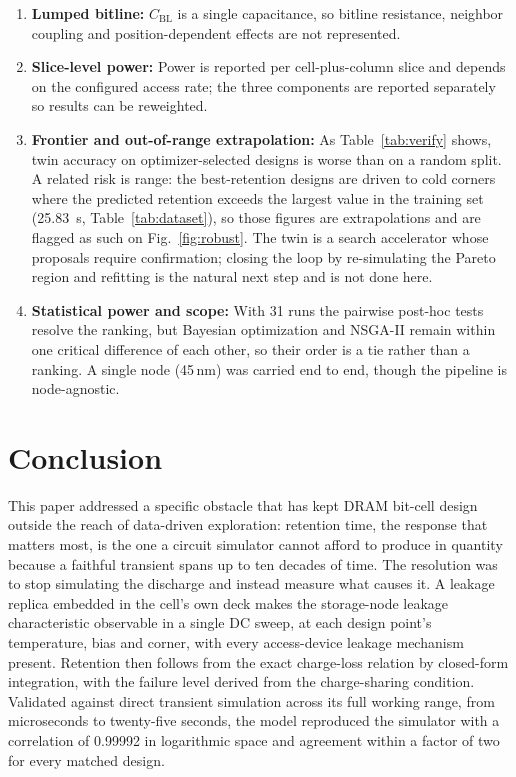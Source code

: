 \documentclass[11pt,a4paper]{article}
\newcommand{\Cbl}{C_{\mathrm{BL}}}
\begin{document}
\begin{enumerate}
\item \textbf{Lumped bitline:} $\Cbl$ is a single capacitance, so bitline
resistance, neighbor coupling and position-dependent effects are not
represented.
\item \textbf{Slice-level power:} Power is reported per cell-plus-column slice and
depends on the configured access rate; the three components are reported
separately so results can be reweighted.
\item \textbf{Frontier and out-of-range extrapolation:} As Table~\ref{tab:verify}
shows, twin accuracy on optimizer-selected designs is worse than on a random split.
A related risk is range: the best-retention designs are driven to cold corners where
the predicted retention exceeds the largest value in the training set
(\SI{25.83}{\second}, Table~\ref{tab:dataset}), so those figures are extrapolations
and are flagged as such on Fig.~\ref{fig:robust}. The twin is a search accelerator
whose proposals require confirmation; closing the loop by re-simulating the Pareto
region and refitting is the natural next step and is not done here.
\item \textbf{Statistical power and scope:} With 31 runs the pairwise post-hoc
tests resolve the ranking, but Bayesian optimization and NSGA-II remain within one
critical difference of each other, so their order is a tie rather than a ranking. A
single node (45\,nm) was carried end to end, though the pipeline is node-agnostic.
\end{enumerate}

\section{Conclusion}
\label{sec:conclusion}

This paper addressed a specific obstacle that has kept DRAM bit-cell design outside
the reach of data-driven exploration: retention time, the response that matters
most, is the one a circuit simulator cannot afford to produce in quantity because a
faithful transient spans up to ten decades of time. The resolution was to stop
simulating the discharge and instead measure what causes it. A leakage replica
embedded in the cell's own deck makes the storage-node leakage characteristic
observable in a single DC sweep, at each design point's temperature, bias and
corner, with every access-device leakage mechanism present. Retention then follows
from the exact charge-loss relation by closed-form integration, with the failure
level derived from the charge-sharing condition. Validated against direct transient
simulation across its full working range, from microseconds to twenty-five seconds,
the model reproduced the simulator with a correlation of 0.99992 in logarithmic
space and agreement within a factor of two for every matched design.
\end{document}
